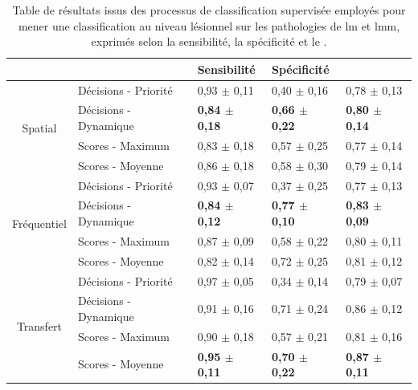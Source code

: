 \begin{table}[H]
    \centering
    \begin{tabular}{cllll}
        \toprule
        \multicolumn{1}{l}{}         &                              & Sensibilité               & Spécificité               & \Fscore{}                 \\ \midrule
        \multirow{4}{*}{Spatial}     & Décisions - Priorité         & 0,93 $\pm$ 0,11             & 0,40 $\pm$ 0,16             & 0,78 $\pm$ 0,13             \\
                                     & Décisions - Dynamique        & \textbf{0,84 $\pm$ 0,18}    & \textbf{0,66 $\pm$ 0,22}    & \textbf{0,80 $\pm$ 0,14}    \\
                                     & Scores - Maximum             & 0,83 $\pm$ 0,18             & 0,57 $\pm$ 0,25             & 0,77 $\pm$ 0,14             \\
                                     & Scores - Moyenne             & 0,86 $\pm$ 0,18             & 0,58 $\pm$ 0,30             & 0,79 $\pm$ 0,14             \\ \midrule
        \multirow{4}{*}{Fréquentiel} & Décisions - Priorité         & 0,93 $\pm$ 0,07             & 0,37 $\pm$ 0,25             & 0,77 $\pm$ 0,13             \\
                                     & Décisions - Dynamique        & \textbf{0,84 $\pm$ 0,12}    & \textbf{0,77 $\pm$ 0,10}    & \textbf{0,83 $\pm$ 0,09}    \\
                                     & Scores - Maximum             & 0,87 $\pm$ 0,09             & 0,58 $\pm$ 0,22             & 0,80 $\pm$ 0,11             \\
                                     & Scores - Moyenne             & 0,82 $\pm$ 0,14             & 0,72 $\pm$ 0,25             & 0,81 $\pm$ 0,12             \\ \midrule
        \multirow{4}{*}{Transfert}   & Décisions - Priorité         & 0,97 $\pm$ 0,05             & 0,34 $\pm$ 0,14             & 0,79 $\pm$ 0,07             \\
                                     & Décisions - Dynamique        & 0,91 $\pm$ 0,16             & 0,71 $\pm$ 0,24             & 0,86 $\pm$ 0,12             \\
                                     & Scores - Maximum             & 0,90 $\pm$ 0,18             & 0,57 $\pm$ 0,21             & 0,81 $\pm$ 0,16             \\
                                     & Scores - Moyenne             & \textbf{0,95 $\pm$ 0,11}    & \textbf{0,70 $\pm$ 0,22}    & \textbf{0,87 $\pm$ 0,11}    \\ \bottomrule
    \end{tabular}
    \caption{Table de résultats issus des processus de classification supervisée employés pour mener une classification au niveau lésionnel sur les pathologies de \gls{lm} et \gls{lmm}, exprimés selon la sensibilité, la spécificité et le \fscore{}.}
    \label{tab:results_lesion_classification_supervised_patient_lm}
\end{table}

